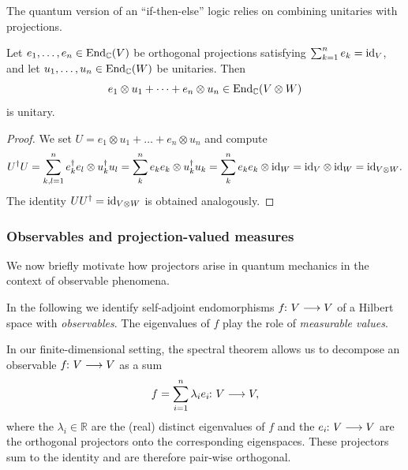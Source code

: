 \documentclass[a4paper, oneside, 12pt]{amsart}
\begin{document}
The quantum version of an ``if-then-else'' logic relies on combining unitaries with projections.

\begin{lemma}\label{lem:unitaries-and-projections}
  Let \(e_{1}, \dots , e_{n} \in \operatorname{End}_{ \mathbb{C}}(V)\) be orthogonal projections satisfying \(\sum_{k=1}^{n}e_{k} = \mathrm{id}_{V}\), and let \(u_{1}, \dots , u_{n} \in \operatorname{End}_{ \mathbb{C}}(W)\) be unitaries.
  Then
  \begin{equation*}
    e_{1}\otimes u_{1} + \dots + e_{n} \otimes u_{n} \in \operatorname{End}_{ \mathbb{C}}(V \otimes W)
  \end{equation*}
  is unitary.
\end{lemma}
\begin{proof}
  We set \(U = e_{1}\otimes u_{1} + \dots + e_{n} \otimes u_{n}\) and compute
  \begin{equation*}
    U^{\dagger} U
    = \sum_{k,l=1}^{n} e_{k}^{\dagger}e_{l} \otimes u_{k}^{\dagger} u_{l}
    = \sum_{k}^{n} e_{k}e_{k} \otimes u_{k}^{\dagger} u_{k}
    = \sum_{k}^{n} e_{k}e_{k} \otimes \mathrm{id}_{W}
    = \mathrm{id}_{V} \otimes \mathrm{id}_{W} = \mathrm{id}_{V\otimes W}.
  \end{equation*}
  The identity \(UU^{\dagger} = \mathrm{id}_{V\otimes W}\) is obtained analogously.
\end{proof}

\subsubsection{Observables and projection-valued measures}\label{sec:observables-and-projection-valued-measures}

We now briefly motivate how projectors arise in quantum mechanics in the context of observable phenomena.

\begin{notation}
  In the following we identify self-adjoint endomorphisms \(f\from V\to V\) of a Hilbert space with \emph{observables}.
  The eigenvalues of \(f\) play the role of \emph{measurable values}.
\end{notation}

In our finite-dimensional setting, the spectral theorem allows us to decompose an observable \(f\from V \to V\) as a sum
\begin{equation*}
  f = \sum_{i=1}^{n} \lambda_{i} e_{i} \from V\to V,
\end{equation*}
where the \(\lambda_{i}\in \mathbb{R}\) are the (real) distinct eigenvalues of \(f\) and the \(e_{i} \from V\to V\) are the orthogonal projectors onto the corresponding eigenspaces.
These projectors sum to the identity and are therefore pair-wise orthogonal.
\end{document}
